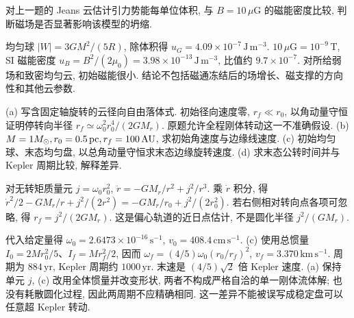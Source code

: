 \begin{exercise}
对上一题的 Jeans 云估计引力势能每单位体积, 与 $B=10\,\mu\mathrm G$ 的磁能密度比较, 判断磁场是否显著影响该模型的坍缩.
\end{exercise}
\begin{solution}
均匀球 $|W|=3GM^2/(5R)$, 除体积得 $u_G=4.09\times10^{-7}\,\mathrm{J\,m^{-3}}$. $10\,\mu\mathrm G=10^{-9}\,\mathrm T$, SI 磁能密度 $u_B=B^2/(2\mu_0)=3.98\times10^{-13}\,\mathrm{J\,m^{-3}}$, 比值约 $9.7\times10^{-7}$. 对所给弱场和致密均匀云, 初始磁能很小. 结论不包括磁通冻结后的场增长、磁支撑的方向性和其他云参数.
\end{solution}

\begin{exercise}
(a) 写含固定轴旋转的云径向自由落体式. 初始径向速度零, $r_f\ll r_0$, 以角动量守恒证明停转向半径 $r_f\simeq\omega_0^2r_0^4/(2GM_r)$. 原题允许全程刚体转动这一不准确假设.
(b) $M=1M_{\odot},r_0=0.5\,\mathrm{pc},r_f=100\,\mathrm{AU}$, 求初始角速度与边缘线速度.
(c) 初始均匀球、末态均匀盘, 以总角动量守恒求末态边缘旋转速度.
(d) 求末态公转时间并与 Kepler 周期比较, 解释差异.
\end{exercise}
\begin{solution}
对无转矩质量元 $j=\omega_0r_0^2$, $\ddot r=-GM_r/r^2+j^2/r^3$. 乘 $\dot r$ 积分, 得 $\dot r^2/2-GM_r/r+j^2/(2r^2)=-GM_r/r_0+j^2/(2r_0^2)$. 若右侧相对转向点各项可忽略, 得 $r_f=j^2/(2GM_r)$. 这是偏心轨道的近日点估计, 不是圆化半径 $j^2/(GM_r)$.

代入给定量得 $\omega_0=2.6473\times10^{-16}\,\mathrm{s^{-1}}$, $v_0=408.4\,\mathrm{cm\,s^{-1}}$. (c) 使用总惯量 $I_0=2Mr_0^2/5$、$I_f=Mr_f^2/2$, 因而 $\omega_f=(4/5)\omega_0(r_0/r_f)^2$, $v_f=3.370\,\mathrm{km\,s^{-1}}$. 周期为 $884\,\mathrm{yr}$, Kepler 周期约 $1000\,\mathrm{yr}$. 末速是 $(4/5)\sqrt2$ 倍 Kepler 速度. (a) 保持单元 $j$, (c) 改用全体惯量并改变形状, 两者不构成严格自洽的单一刚体流体解; 也没有耗散圆化过程, 因此两周期不应精确相同. 这一差异不能被误写成稳定盘可以任意超 Kepler 转动.
\end{solution}
